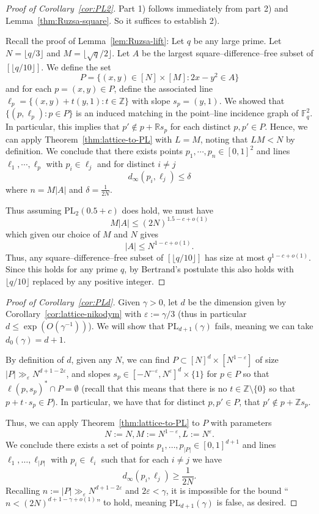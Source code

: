 \documentclass[12pt,reqno]{amsart}
\theoremstyle{plain}
\theoremstyle{definition}
\newcommand{\F}{\mathbb{F}}
\newcommand{\Z}{\mathbb{Z}}
\newcommand{\R}{\mathbb{R}}
\newcommand{\PL}{\mathrm{PL}}
\newcommand{\1}{\mathbf{1}}
\begin{document}
\begin{proof}[Proof of Corollary~\ref{cor:PL2}]
    Part 1) follows immediately from part 2) and Lemma~\ref{thm:Ruzsa-square}. So it suffices to establish 2).

    Recall the proof of Lemma~\ref{lem:Ruzsa-lift}: Let $q$ be any large prime. Let $N = \lfloor q / 3 \rfloor$ and $M = \lfloor \sqrt{q} / 2 \rfloor$. Let $A$ be the largest square--difference--free subset of $[\lfloor q / 10 \rfloor]$. We define the set 
    $$P = \{(x, y) \in [N] \times [M]: 2x - y^2 \in A\}$$
    and for each $p = (x,y) \in P$, define the associated line $\ell_p = \{(x, y) + t(y, 1): t\in \Z\}$ with slope $s_p = (y, 1)$. We showed that $\{(p,\ell_p):p\in P\}$ is an induced matching in the point--line incidence graph of $\F_q^2$. In particular, this implies that $p' \notin p + \R s_p$ for each distinct $p, p' \in P$. Hence, we can apply Theorem~\ref{thm:lattice-to-PL} with $L = M$, noting that $LM < N$ by definition. We conclude that there exists points $p_1, \cdots, p_n \in [0, 1]^2$ and lines $\ell_1, \cdots, \ell_p$ with $p_i \in \ell_j$ and for distinct $i \neq j$
    $$d_\infty(p_i, \ell_j) \leq \delta$$
    where $n = M |A|$ and $\delta = \frac{1}{2N}$.

    Thus assuming $\PL_2(0.5 + c)$ does hold, we must have
    $$M |A| \leq (2N)^{1.5 - c + o(1)}$$
    which given our choice of $M$ and $N$ gives
    $$|A| \leq N^{1 - c + o(1)}.$$
    Thus, any square--difference--free subset of $[\lfloor q / 10 \rfloor]$ has size at most $q^{1 - c + o(1)}$. Since this holds for any prime $q$, by Bertrand's postulate this also holds with $\lfloor q / 10 \rfloor$ replaced by any positive integer.
\end{proof}
\begin{proof}[Proof of Corollary~\ref{cor:PLd}]
    Given $\gamma >0$, let $d$ be the dimension given by Corollary~\ref{cor:lattice-nikodym} with $\varepsilon :=\gamma /3$ (thus in particular $d\le \exp(O(\gamma^{-1}))$). We will show that $\PL_{d+1}(\gamma)$ fails, meaning we can take $d_0(\gamma)=d+1$.

    By definition of $d$, given any $N$, we can find $P\subset [N]^{d}\times [N^{1-\varepsilon}]$ of size $|P|\gg_\varepsilon N^{d+1-2\varepsilon}$, and slopes $s_p\in [-N^{-\varepsilon},N^{\varepsilon}]^d\times \{1\}$ for $p\in P$ so that $\ell(p,s_p)^*\cap P=\emptyset$ (recall that this means that there is no $t\in \Z\setminus \{0\}$ so that $p+t\cdot s_p\in P$). In particular, we have that for distinct $p,p'\in P$, that $p'\not \in p+\Z s_p$.

    Thus, we can apply Theorem~\ref{thm:lattice-to-PL} to $P$ with parameters \[N:=N,M:=N^{1-\varepsilon},L:=N^{\varepsilon}.\] We conclude there exists a set of points $p_1,\dots,p_{|P|}\in [0,1]^{d+1}$ and lines $\ell_1,\dots,\ell_{|P|}$ with $p_i\in \ell_i$ such that for each $i\neq j$ we have\[d_\infty(p_i,\ell_j)\ge \frac{1}{2N}.\]
    Recalling $n:=|P|\gg_\varepsilon N^{d+1-2\varepsilon}$ and $2\varepsilon<\gamma$, it is impossible for the bound ``$n< (2N)^{d+1-\gamma+o(1)}$'' to hold, meaning $\PL_{d+1}(\gamma)$ is false, as desired.
\end{proof}
\end{document}
